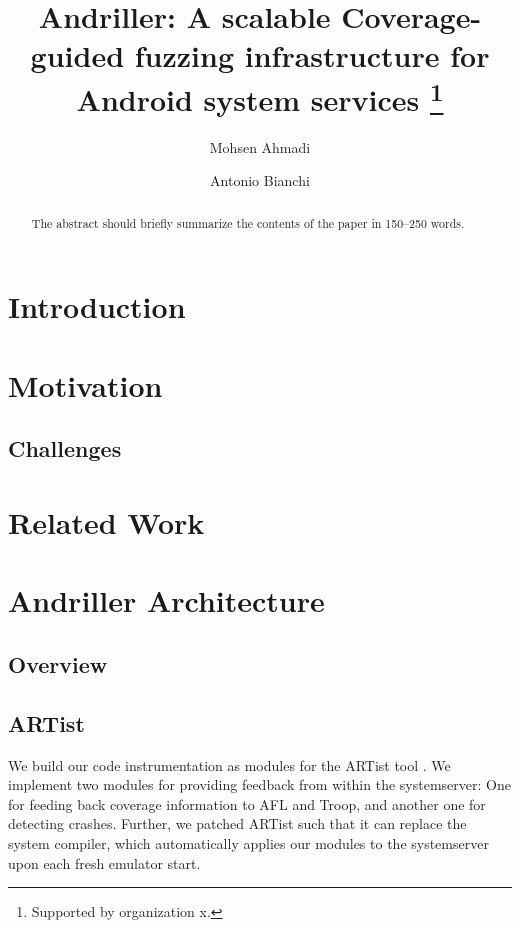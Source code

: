 \documentclass[runningheads]{llncs}
\begin{document}
%
\title{Andriller: A scalable Coverage-guided fuzzing infrastructure for Android system services \thanks{Supported by organization x.}}
%
%
\author{Mohsen Ahmadi \and
Antonio Bianchi} %
%
%
%
\maketitle              %
%
\begin{abstract}
The abstract should briefly summarize the contents of the paper in
150--250 words.

\end{abstract}
%
%
%
\section{Introduction}
\section{Motivation}
\subsection{Challenges}
\section{Related Work}
\section{Andriller Architecture}
\subsection{Overview}
\subsection{ARTist}
We build our code instrumentation as modules for the ARTist tool \cite{artist}. We implement two modules for providing feedback from within the systemserver: One for feeding back coverage information to AFL and Troop, and another one for detecting crashes. Further, we patched ARTist such that it can replace the system compiler, which automatically applies our modules to the systemserver upon each fresh emulator start.
\end{document}
